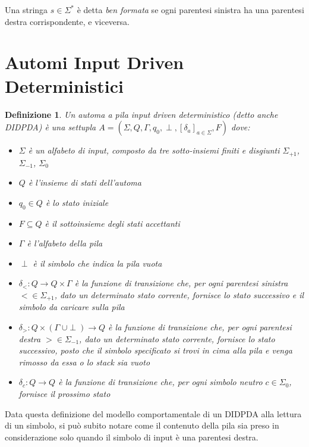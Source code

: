 \documentclass[a4paper,12pt]{report}
\newtheorem{definition}{Definizione}[chapter]
\theoremstyle{propositionstyle}
\begin{document}
    Una stringa $s \in \Sigma^*$ è detta \textit{ben formata} se ogni parentesi sinistra ha una parentesi destra corrispondente, e viceversa.

    \section{Automi Input Driven Deterministici}

    \begin{definition}\label{def:didpda}
        Un \textit{automa a pila input driven deterministico} (detto anche DIDPDA) è una settupla $A = \left(\Sigma, Q, \Gamma, q_0, \perp, \left[ \delta_a \right]_{a \in \Sigma}, F\right)$ dove:
        \begin{itemize}
            \item $\Sigma$ è un alfabeto di input, composto da tre sotto-insiemi finiti e disgiunti $\Sigma_{+1}$, $\Sigma_{-1}$, $\Sigma_{0}$
            \item $Q$ è l'insieme di stati dell'automa
            \item $q_{0} \in Q$ è lo stato iniziale
            \item $F \subseteq Q$ è il sottoinsieme degli stati \textit{accettanti}
            \item $\Gamma$ è l'\textit{alfabeto della pila}
            \item $\perp$ è il simbolo che indica la pila vuota
            \item $\delta_{<} : Q \rightarrow Q \times \Gamma$ è la funzione di transizione che, per ogni parentesi sinistra $< \in \Sigma_{+1}$, dato un determinato stato corrente, fornisce lo stato successivo e il simbolo da caricare sulla pila
            \item $\delta_{>} : Q \times \left(\Gamma\;\cup\perp\right) \rightarrow Q$ è la funzione di transizione che, per ogni parentesi destra $> \in \Sigma_{-1}$, dato un determinato stato corrente, fornisce lo stato successivo, posto che il simbolo specificato si trovi in cima alla pila e venga rimosso da essa o lo stack sia vuoto
            \item $\delta_{c} : Q \rightarrow Q$ è la funzione di transizione che, per ogni simbolo neutro $c \in \Sigma_{0}$, fornisce il prossimo stato
        \end{itemize}
    \end{definition}

    Data questa definizione del modello comportamentale di un DIDPDA alla lettura di un simbolo, si può subito notare come il contenuto della pila
    sia preso in considerazione solo quando il simbolo di input è una parentesi destra. 
    
\end{document}
